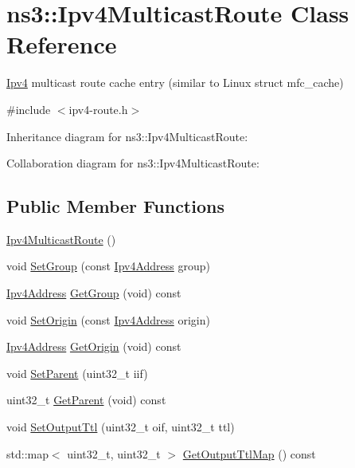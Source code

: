 \hypertarget{classns3_1_1Ipv4MulticastRoute}{}\section{ns3\+:\+:Ipv4\+Multicast\+Route Class Reference}
\label{classns3_1_1Ipv4MulticastRoute}


\hyperlink{classns3_1_1Ipv4}{Ipv4} multicast route cache entry (similar to Linux struct mfc\+\_\+cache)  




{\ttfamily \#include $<$ipv4-\/route.\+h$>$}



Inheritance diagram for ns3\+:\+:Ipv4\+Multicast\+Route\+:


Collaboration diagram for ns3\+:\+:Ipv4\+Multicast\+Route\+:
\subsection*{Public Member Functions}
\begin{DoxyCompactItemize}
\item 
\hyperlink{classns3_1_1Ipv4MulticastRoute_af42fc55f1defd5a21e3e054bd8d125ac}{Ipv4\+Multicast\+Route} ()
\item 
void \hyperlink{classns3_1_1Ipv4MulticastRoute_a91633b0f5cd45518b683b3341e112e53}{Set\+Group} (const \hyperlink{classns3_1_1Ipv4Address}{Ipv4\+Address} group)
\item 
\hyperlink{classns3_1_1Ipv4Address}{Ipv4\+Address} \hyperlink{classns3_1_1Ipv4MulticastRoute_aabc135733ccaae1ac4ab83155297caa3}{Get\+Group} (void) const 
\item 
void \hyperlink{classns3_1_1Ipv4MulticastRoute_a6e04991ab58a9b7d7e0a3b7281eabddc}{Set\+Origin} (const \hyperlink{classns3_1_1Ipv4Address}{Ipv4\+Address} origin)
\item 
\hyperlink{classns3_1_1Ipv4Address}{Ipv4\+Address} \hyperlink{classns3_1_1Ipv4MulticastRoute_a06141556da3ac220f3f986145c902c34}{Get\+Origin} (void) const 
\item 
void \hyperlink{classns3_1_1Ipv4MulticastRoute_aff3e873f80be8d56efeee29401ec5e78}{Set\+Parent} (uint32\+\_\+t iif)
\item 
uint32\+\_\+t \hyperlink{classns3_1_1Ipv4MulticastRoute_a80d9b42d7af85621ea794b67a0508550}{Get\+Parent} (void) const 
\item 
void \hyperlink{classns3_1_1Ipv4MulticastRoute_a8afeb13b65406917927683b87b5a26d7}{Set\+Output\+Ttl} (uint32\+\_\+t oif, uint32\+\_\+t ttl)
\item 
std\+::map$<$ uint32\+\_\+t, uint32\+\_\+t $>$ \hyperlink{classns3_1_1Ipv4MulticastRoute_a2ee89386d9b7f9e8548461cf2d500a5d}{Get\+Output\+Ttl\+Map} () const 
\end{DoxyCompactItemize}
